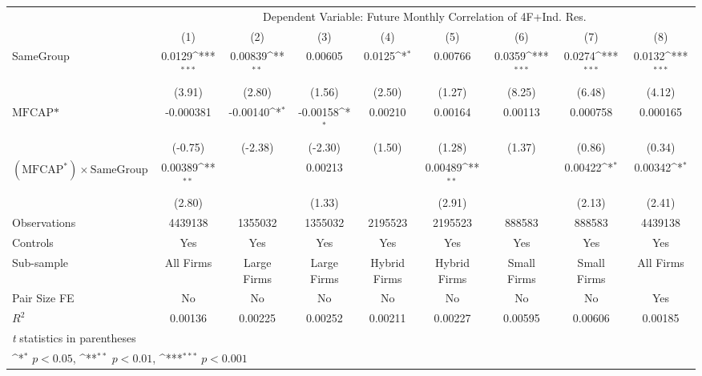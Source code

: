 {
\def\sym#1{\ifmmode^{#1}\else\(^{#1}\)\fi}
\begin{tabular}{l*{8}{c}}
\hline\hline
                &\multicolumn{8}{c}{Dependent Variable: Future Monthly Correlation of 4F+Ind. Res.}                                                                     \\\cmidrule(lr){2-9}
                &\multicolumn{1}{c}{(1)}         &\multicolumn{1}{c}{(2)}         &\multicolumn{1}{c}{(3)}         &\multicolumn{1}{c}{(4)}         &\multicolumn{1}{c}{(5)}         &\multicolumn{1}{c}{(6)}         &\multicolumn{1}{c}{(7)}         &\multicolumn{1}{c}{(8)}         \\
\hline
SameGroup       &   0.0129\sym{***}&  0.00839\sym{**} &  0.00605         &   0.0125\sym{*}  &  0.00766         &   0.0359\sym{***}&   0.0274\sym{***}&   0.0132\sym{***}\\
                &   (3.91)         &   (2.80)         &   (1.56)         &   (2.50)         &   (1.27)         &   (8.25)         &   (6.48)         &   (4.12)         \\
[1em]
$ \text{MFCAP*} $&-0.000381         & -0.00140\sym{*}  & -0.00158\sym{*}  &  0.00210         &  0.00164         &  0.00113         & 0.000758         & 0.000165         \\
                &  (-0.75)         &  (-2.38)         &  (-2.30)         &   (1.50)         &   (1.28)         &   (1.37)         &   (0.86)         &   (0.34)         \\
[1em]
 $ (\text{MFCAP}^*) \times {\text{SameGroup} }  $ &  0.00389\sym{**} &                  &  0.00213         &                  &  0.00489\sym{**} &                  &  0.00422\sym{*}  &  0.00342\sym{*}  \\
                &   (2.80)         &                  &   (1.33)         &                  &   (2.91)         &                  &   (2.13)         &   (2.41)         \\
\hline
Observations    &  4439138         &  1355032         &  1355032         &  2195523         &  2195523         &   888583         &   888583         &  4439138         \\
Controls        &      Yes         &      Yes         &      Yes         &      Yes         &      Yes         &      Yes         &      Yes         &      Yes         \\
Sub-sample      &All Firms         &Large Firms         &Large Firms         &Hybrid Firms         &Hybrid Firms         &Small Firms         &Small Firms         &All Firms         \\
Pair Size FE    &       No         &       No         &       No         &       No         &       No         &       No         &       No         &      Yes         \\
$ R^2 $         &  0.00136         &  0.00225         &  0.00252         &  0.00211         &  0.00227         &  0.00595         &  0.00606         &  0.00185         \\
\hline\hline
\multicolumn{9}{l}{\footnotesize \textit{t} statistics in parentheses}\\
\multicolumn{9}{l}{\footnotesize \sym{*} \(p<0.05\), \sym{**} \(p<0.01\), \sym{***} \(p<0.001\)}\\
\end{tabular}
}
